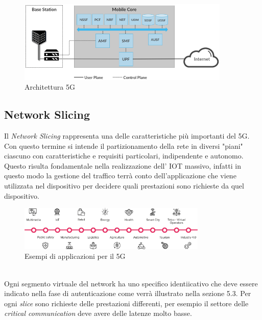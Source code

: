 \begin{figure}[ht]
    \centering
    \includegraphics[width=0.9\textwidth]{images/5g-planes.png}
    \caption{Architettura 5G\cite{5g-approach}}
\end{figure}

\clearpage

\subsection{Network Slicing}
Il \textit{Network Slicing} rappresenta una delle caratteristiche più importanti del 5G. Con questo termine si intende il partizionamento della
rete in diversi "piani" ciascuno con caratteristiche e requisiti particolari, indipendente e autonomo. Questo risulta fondamentale nella realizzazione 
dell' IOT massivo, infatti in questo modo la gestione del traffico terrà conto dell'applicazione che viene utilizzata nel dispositivo per decidere quali prestazioni sono 
richieste da quel dispositivo.
\begin{figure}[ht]
    \centering
    \includegraphics[width=0.8\textwidth]{images/5g-eg-of-use.png}
    \caption{Esempi di applicazioni per il 5G}
\end{figure}\\
Ogni segmento virtuale del network ha uno specifico identiicativo che deve essere indicato nella fase di autenticazione come verrà illustrato nella sezione 5.3. Per ogni \textit{slice} sono 
richieste delle prestazioni differenti, per esempio il settore delle \textit{critical communication} deve avere delle latenze molto basse.
